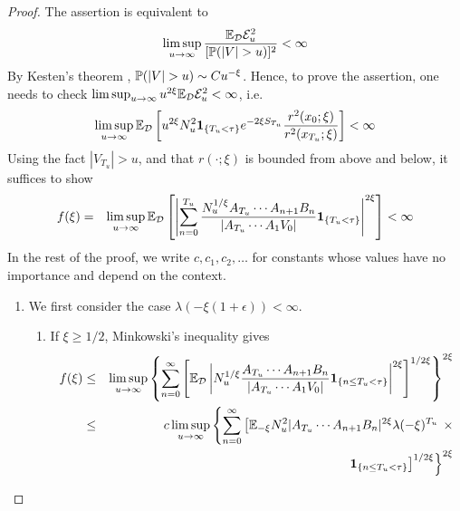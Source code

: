 \documentclass{article}
\theoremstyle{remark}
\begin{document}
\begin{proof}
  The assertion is equivalent to
  \[
  \limsup_{u \to \infty} {\E_{\mathcal D} \mathcal E_u^2 \over [\P(|V|
    > u)]^2} < \infty
  \]
  By Kesten's theorem \cite{Kesten1973}, $\P(|V| > u) \sim C
  u^{-\xi}$. Hence, to prove the assertion, one needs to check
  $\limsup_{u \to \infty} u^{2\xi}\E_{\mathcal D} \mathcal E_u^2 <
  \infty$, i.e.
  \[
  \limsup_{u \to \infty} \E_{\mathcal D}  \left[u^{2\xi}
    N_u^2 \1{T_u < \tau} e^{-2\xi S_{T_u}} {r^2(x_0; \xi)
      \over r^2(x_{T_u}; \xi)}\right] < \infty
 \]
 Using the fact $|V_{T_u}| > u$, and that $r(\cdot; \xi)$ is bounded
 from above and below, it suffices to show
 \begin{eqnarray}
   f(\xi) &=& \limsup_{u \to \infty} \E_{\mathcal D} \left[
     \left|
       \sum_{n=0}^{T_u}
       \frac{
         N_u^{1/\xi} A_{T_u} \cdots A_{n+1} B_n 
       }{
         |A_{T_u} \cdots A_1 V_0|
       }
       \1{T_u < \tau}
     \right|^{2 \xi}
   \right] < \infty \label{eq:efficiency_target}
 \end{eqnarray}
  In the rest of the proof, we write $c, c_1, c_2, \dots$ for
  constants whose values have no importance and depend on the
  context.
  \begin{enumerate}
  \item We first consider the case $\lambda(-\xi(1 + \epsilon)) <
    \infty$.
    \begin{enumerate}
    \item If $\xi \geq 1/2$, Minkowski's inequality gives
      \begin{eqnarray}
        f(\xi) &\leq& \limsup_{u \to \infty}
        \left\{
          \sum_{n=0}^{\infty}
          \left[
            \E_{\mathcal D} \left|
              N_u^{1/\xi}
              \frac{
                A_{T_u} \cdots A_{n+1} B_n 
              }{
                |A_{T_u} \cdots A_1 V_0|
              }
              \1{n \leq T_u < \tau}
            \right|^{2 \xi}
          \right]^{1/2\xi}
        \right\}^{2\xi} \nonumber \\
        &\leq& c \limsup_{u \to \infty}
        \left\{
          \sum_{n=0}^{\infty}
          \left[
            \E_{-\xi} N_u^2 
            |A_{T_u} \cdots A_{n+1} B_n|^{2\xi}
            \lambda(-\xi)^{T_u} \right. \right.\times \nonumber \\
            &&   \left. \left.
            \1{n \leq T_u < \tau}
          \right]^{1/2\xi}
        \right\}^{2\xi} \label{eq:xi_above_half_prel}
      \end{eqnarray}

\end{enumerate}
\end{enumerate}
\end{proof}
\end{document}
